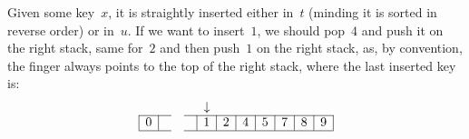 Given some key~\(x\), it is straightly inserted either in~\(t\)
(minding it is sorted in reverse order) or in~\(u\). If we want to
insert~\(1\), we should pop~\(4\) and push it on the right stack, same
for~\(2\) and then push~\(1\) on the right stack, as, by convention,
the finger always points to the top of the right stack, where the last
inserted key is:
\begin{equation*}
\abovedisplayskip=0pt
\begin{array}{@{}|c|ccc|c|c|c|c|c|c|c|@{}}
  \multicolumn{1}{c}{} & \multicolumn{1}{c}{} & \multicolumn{1}{c}{}
& \multicolumn{1}{c}{} & \multicolumn{1}{c}{\downarrow}\\
\cline{1-2}\cline{4-11}
0 & & & & 1 & 2 & 4 & 5 & 7 & 8 & 9\\
\cline{1-2}\cline{4-11}
\end{array}
\end{equation*}

